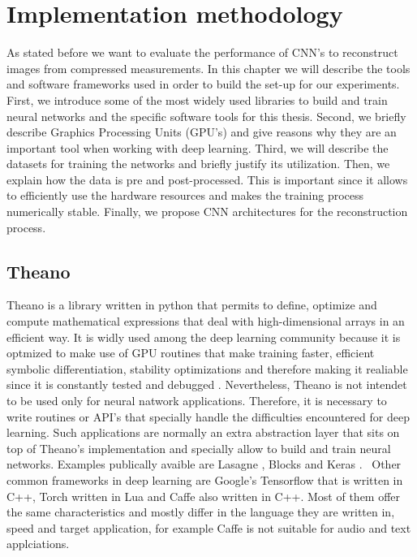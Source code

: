\chapter{Implementation methodology}
As stated before we want to evaluate the performance of CNN's to reconstruct images from compressed measurements. In this chapter we will describe the tools and software frameworks used in order to build the set-up for our experiments. First,  we introduce some of the most widely used libraries to build and train neural networks and the specific software tools for this thesis. Second, we briefly describe Graphics Processing Units (GPU's) and give reasons why they are an important tool when working with deep learning. Third, we will describe the datasets for training the networks and briefly justify its utilization. Then, we explain how the data is pre and post-processed. This is important since it allows to efficiently use the hardware resources and makes the training process numerically stable. Finally, we propose CNN architectures for the reconstruction process.   

\section{Theano}
Theano is a library written in python that permits to define, optimize and compute mathematical expressions that deal with high-dimensional arrays in an efficient way. It is widly used among the deep learning community because it is optmized to make use of GPU routines that make training faster, efficient symbolic differentiation, stability optimizations and therefore making it realiable since it is constantly tested and debugged \cite{2016arXiv160502688short}. Nevertheless, Theano is not intendet to be used only for neural natwork applications. Therefore, it is necessary to write routines or API's that specially handle the difficulties encountered for deep learning. Such applications are normally an extra abstraction layer that sits on top of Theano's implementation and specially allow to build and train neural networks. Examples publically avaible are Lasagne \cite{sander_dieleman_2015_27878}, Blocks \cite{van2015blocks} and Keras \cite{chollet2015keras}. \
Other common frameworks in deep learning are Google's Tensorflow \cite{tensorflow2015-whitepaper} that is written in C++, Torch \cite{torch} written in Lua and Caffe \cite{jia2014caffe} also written in C++. Most of them offer the same characteristics and mostly differ in the language they are written in, speed and target application, for example Caffe is not suitable for audio and text applciations.           
